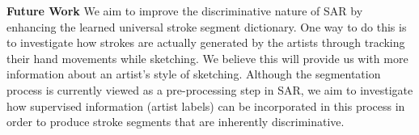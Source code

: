 \textbf{Future Work} We aim to improve the discriminative nature of SAR by enhancing the learned universal stroke segment dictionary. One way to do this is to investigate how strokes are actually generated by the artists through tracking their hand movements while sketching. We believe this will provide us with more information about an artist's style of sketching. Although the segmentation process is currently viewed as a pre-processing step in SAR, we aim to investigate how supervised information (artist labels) can be incorporated in this process in order to produce stroke segments that are inherently discriminative. 





